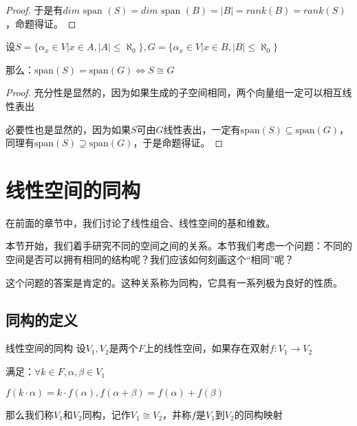 \documentclass[12pt, a4paper, oneside, UTF8]{ctexbook}
\begin{document}
\begin{para}{0}
\begin{proof}
						于是有$dim \text{ span }(S)=dim \text{ span }(B)=|B|=rank(B)=rank(S)$，命题得证。
					\end{proof}
				\point{}
					\begin{proposition}
						设$S=\{\alpha_x \in V| x \in A,|A| \leqslant \aleph_0\},G=\{\alpha_x \in V| x \in B,|B| \leqslant \aleph_0\}$

						那么：$\text{span}(S)=\text{span}(G) \Leftrightarrow S \cong G$
					\end{proposition}
					\begin{proof}
						充分性是显然的，因为如果生成的子空间相同，两个向量组一定可以相互线性表出

						必要性也是显然的，因为如果$S$可由$G$线性表出，一定有$\text{span}(S)\subseteq\text{span}(G)$，同理有$\text{span}(S)\supseteq\text{span}(G)$，于是命题得证。
					\end{proof}
			\end{para}
	\section{线性空间的同构}
		在前面的章节中，我们讨论了线性组合、线性空间的基和维数。

		本节开始，我们着手研究不同的空间之间的关系。本节我们考虑一个问题：不同的空间是否可以拥有相同的结构呢？我们应该如何刻画这个“相同”呢？

		这个问题的答案是肯定的。这种关系称为同构，它具有一系列极为良好的性质。
		\subsection{同构的定义}
			\begin{defn}{线性空间的同构}
				设$V_1,V_2$是两个$F$上的线性空间，如果存在双射$f:V_1 \rightarrow V_2$

				满足：$\forall k \in F,\alpha ,\beta \in V_1$

				$f(k\cdot\alpha )=k\cdot f(\alpha ),f(\alpha+\beta )=f(\alpha )+f(\beta )$

				那么我们称$V_1$和$V_2$同构，记作$V_1 \cong V_2$，并称$f$是$V_1$到$V_2$的同构映射
			\end{defn}
\end{document}
